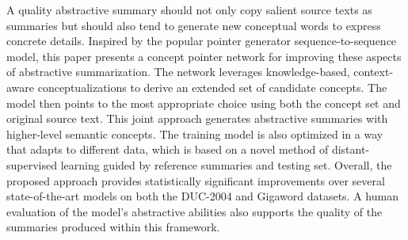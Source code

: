 A quality abstractive summary should not only copy salient source texts as summaries but should also tend to generate new conceptual words to express concrete details. Inspired by the popular pointer generator sequence-to-sequence model, this paper presents a concept pointer network for improving these aspects of abstractive summarization. The network leverages knowledge-based, context-aware conceptualizations to derive an extended set of candidate concepts. The model then points to the most appropriate choice using both the concept set and original source text. This joint approach generates abstractive summaries with higher-level semantic concepts. The training model is also optimized in a way that adapts to different data, which is based on a novel method of distant-supervised learning guided by reference summaries and testing set. Overall, the proposed approach provides statistically significant improvements over several state-of-the-art models on both the DUC-2004 and Gigaword datasets.  A human evaluation of the model's abstractive abilities also supports the quality of the summaries produced within this framework.
